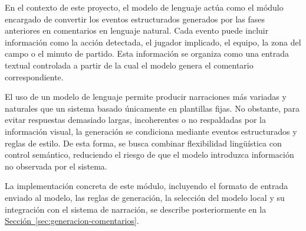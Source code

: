 En el contexto de este proyecto, el modelo de lenguaje actúa como el módulo encargado de convertir los eventos estructurados generados por las fases anteriores en comentarios en lenguaje natural. Cada evento puede incluir información como la acción detectada, el jugador implicado, el equipo, la zona del campo o el minuto de partido. Esta información se organiza como una entrada textual controlada a partir de la cual el modelo genera el comentario correspondiente.

El uso de un modelo de lenguaje permite producir narraciones más variadas y naturales que un sistema basado únicamente en plantillas fijas. No obstante, para evitar respuestas demasiado largas, incoherentes o no respaldadas por la información visual, la generación se condiciona mediante eventos estructurados y reglas de estilo. De esta forma, se busca combinar flexibilidad lingüística con control semántico, reduciendo el riesgo de que el modelo introduzca información no observada por el sistema.

La implementación concreta de este módulo, incluyendo el formato de entrada enviado al modelo, las reglas de generación, la selección del modelo local y su integración con el sistema de narración, se describe posteriormente en la \hyperref[sec:generacion-comentarios]{Sección~\ref*{sec:generacion-comentarios}}.